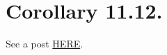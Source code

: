 

\section{Corollary 11.12.}

See a post \href{https://math.stackexchange.com/questions/3498733/every-prime-ideal-has-finite-height-in-a-noetherian-ring}{HERE}.
